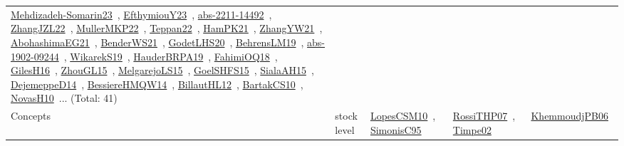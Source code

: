 {\begin{longtable}{lp{3cm}>{\raggedright\arraybackslash}p{6cm}>{\raggedright\arraybackslash}p{6cm}>{\raggedright\arraybackslash}p{8cm}}
\href{papers/Mehdizadeh-Somarin23.pdf}{Mehdizadeh-Somarin23}~\cite{Mehdizadeh-Somarin23}, \href{papers/EfthymiouY23.pdf}{EfthymiouY23}~\cite{EfthymiouY23}, \href{articles/abs-2211-14492.pdf}{abs-2211-14492}~\cite{abs-2211-14492}, \href{papers/ZhangJZL22.pdf}{ZhangJZL22}~\cite{ZhangJZL22}, \href{articles/MullerMKP22.pdf}{MullerMKP22}~\cite{MullerMKP22}, \href{papers/Teppan22.pdf}{Teppan22}~\cite{Teppan22}, \href{articles/HamPK21.pdf}{HamPK21}~\cite{HamPK21}, \href{articles/ZhangYW21.pdf}{ZhangYW21}~\cite{ZhangYW21}, \href{articles/AbohashimaEG21.pdf}{AbohashimaEG21}~\cite{AbohashimaEG21}, \href{papers/BenderWS21.pdf}{BenderWS21}~\cite{BenderWS21}, \href{papers/GodetLHS20.pdf}{GodetLHS20}~\cite{GodetLHS20}, \href{papers/BehrensLM19.pdf}{BehrensLM19}~\cite{BehrensLM19}, \href{articles/abs-1902-09244.pdf}{abs-1902-09244}~\cite{abs-1902-09244}, \href{articles/WikarekS19.pdf}{WikarekS19}~\cite{WikarekS19}, \href{articles/HauderBRPA19.pdf}{HauderBRPA19}~\cite{HauderBRPA19}, \href{articles/FahimiOQ18.pdf}{FahimiOQ18}~\cite{FahimiOQ18}, \href{papers/GilesH16.pdf}{GilesH16}~\cite{GilesH16}, \href{papers/ZhouGL15.pdf}{ZhouGL15}~\cite{ZhouGL15}, \href{papers/MelgarejoLS15.pdf}{MelgarejoLS15}~\cite{MelgarejoLS15}, \href{articles/GoelSHFS15.pdf}{GoelSHFS15}~\cite{GoelSHFS15}, \href{papers/SialaAH15.pdf}{SialaAH15}~\cite{SialaAH15}, \href{papers/DejemeppeD14.pdf}{DejemeppeD14}~\cite{DejemeppeD14}, \href{papers/BessiereHMQW14.pdf}{BessiereHMQW14}~\cite{BessiereHMQW14}, \href{papers/BillautHL12.pdf}{BillautHL12}~\cite{BillautHL12}, \href{articles/BartakCS10.pdf}{BartakCS10}~\cite{BartakCS10}, \href{articles/NovasH10.pdf}{NovasH10}~\cite{NovasH10}... (Total: 41)\\
Concepts & stock level & \href{articles/LopesCSM10.pdf}{LopesCSM10}~\cite{LopesCSM10}, \href{papers/SimonisC95.pdf}{SimonisC95}~\cite{SimonisC95} & \href{papers/RossiTHP07.pdf}{RossiTHP07}~\cite{RossiTHP07}, \href{articles/Timpe02.pdf}{Timpe02}~\cite{Timpe02} & \href{papers/KhemmoudjPB06.pdf}{KhemmoudjPB06}~\cite{KhemmoudjPB06}\\

\end{longtable}}
